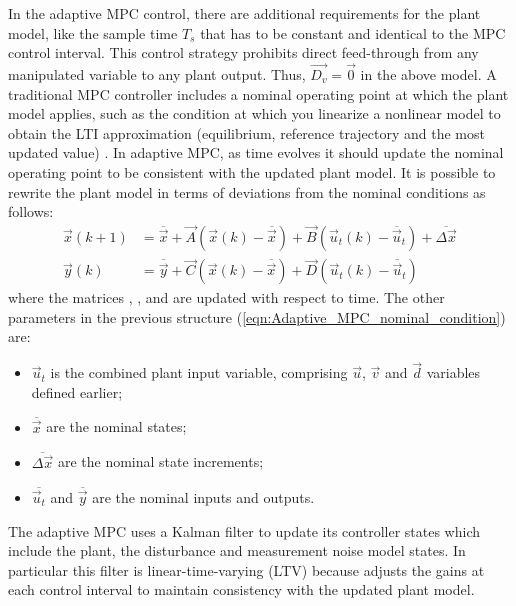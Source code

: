 In the adaptive MPC control, there are additional requirements for the plant model, like the sample time $T_s$ that has to be constant and identical to the MPC control interval. This control strategy prohibits direct feed-through from any manipulated variable to any plant output. Thus, $\vec{D_v} = \vec{0}$ in the above model.
A traditional MPC controller includes a nominal operating point at which the plant model applies, such as the condition at which you linearize a nonlinear model to obtain the LTI approximation (equilibrium, reference trajectory and the	
most updated value) \cite{mpctoolbox}. In adaptive MPC, as time evolves it should update the nominal operating point to be consistent with the updated plant model. It is possible to rewrite the plant model in terms of deviations from the nominal conditions as follows:
\begin{equation}
\label{eqn:Adaptive_MPC_nominal_condition}
\begin{aligned}
\vec{x}(k+1)&=\overline{\vec{x}}+\vec{A}(\vec{x}(k)-\overline{\vec{x}})+ \vec{B}(\vec{u}_t(k)-\overline{\vec{u}}_t)+\overline{\Delta \vec{x}} \\
\vec{y}(k)&=\overline{\vec{y}}+\vec{C}(\vec{x}(k)-\overline{\vec{x}}) + \vec{D}(\vec{u}_t(k)-\overline{\vec{u}}_t)
\end{aligned}
\end{equation}
where the matrices , ,  and  are updated with respect to time. The other parameters in the previous structure (\ref{eqn:Adaptive_MPC_nominal_condition}) are:
\begin{itemize}
	\item $\vec{u}_t$ is the combined plant input variable, comprising $\vec{u}$, $\vec{v}$ and $\vec{d}$ variables defined earlier;
	\item $\overline{\vec{x}}$ are the nominal states;
	\item $\overline{\Delta \vec{x}}$ are the nominal state increments;
	\item $\overline{\vec{u}_t}$ and $\overline{\vec{y}}$ are the nominal inputs and outputs.
\end{itemize} 
The adaptive MPC uses a Kalman filter to update its controller states which include the plant, the disturbance and measurement noise model states. In particular this filter is linear-time-varying (LTV) because adjusts the gains at each control
interval to maintain consistency with the updated plant model.